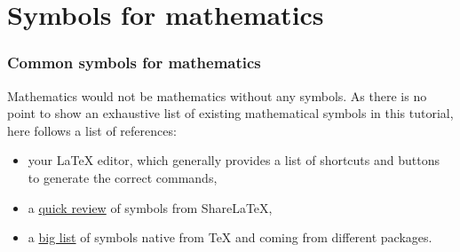 \documentclass[11pt]{beamer}
\begin{document}
\section{Symbols for mathematics}

\begin{frame}
	\frametitle{Common symbols for mathematics}
	
	Mathematics would not be mathematics without any symbols.
	As there is no point to show an exhaustive list of existing mathematical symbols in this tutorial, here follows a list of references:
	\begin{itemize}
		\item your \LaTeX{} editor, which generally provides a list of shortcuts and buttons to generate the correct commands,
		\item a \href{https://fr.sharelatex.com/learn/List_of_Greek_letters_and_math_symbols}{quick review} of symbols from ShareLaTeX,
		\item a \href{http://www.rpi.edu/dept/arc/training/latex/LaTeX_symbols.pdf}{big list} of symbols native from \TeX{} and coming from different packages.
	\end{itemize}
\end{frame}


%
%


\end{document}

